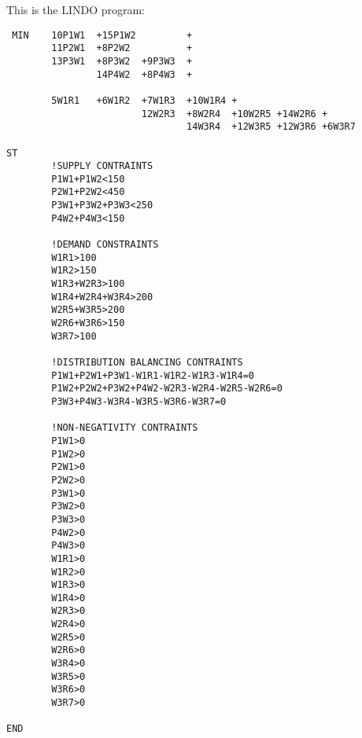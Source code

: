 \documentclass[12pt]{report}
\begin{document}
This is the LINDO program:\\
\begin{verbatim}
 MIN    10P1W1  +15P1W2         +
        11P2W1  +8P2W2          +
        13P3W1  +8P3W2  +9P3W3  +
                14P4W2  +8P4W3  +
        
        5W1R1   +6W1R2  +7W1R3  +10W1R4 +
                        12W2R3  +8W2R4  +10W2R5 +14W2R6 +
                                14W3R4  +12W3R5 +12W3R6 +6W3R7

ST
        !SUPPLY CONTRAINTS
        P1W1+P1W2<150
        P2W1+P2W2<450
        P3W1+P3W2+P3W3<250
        P4W2+P4W3<150

        !DEMAND CONSTRAINTS
        W1R1>100
        W1R2>150
        W1R3+W2R3>100
        W1R4+W2R4+W3R4>200
        W2R5+W3R5>200
        W2R6+W3R6>150
        W3R7>100        

        !DISTRIBUTION BALANCING CONTRAINTS
        P1W1+P2W1+P3W1-W1R1-W1R2-W1R3-W1R4=0
        P1W2+P2W2+P3W2+P4W2-W2R3-W2R4-W2R5-W2R6=0
        P3W3+P4W3-W3R4-W3R5-W3R6-W3R7=0

        !NON-NEGATIVITY CONTRAINTS
        P1W1>0
        P1W2>0
        P2W1>0
        P2W2>0
        P3W1>0
        P3W2>0
        P3W3>0
        P4W2>0
        P4W3>0
        W1R1>0
        W1R2>0
        W1R3>0
        W1R4>0
        W2R3>0
        W2R4>0
        W2R5>0
        W2R6>0
        W3R4>0
        W3R5>0
        W3R6>0
        W3R7>0

END
\end{verbatim}
\end{document}
